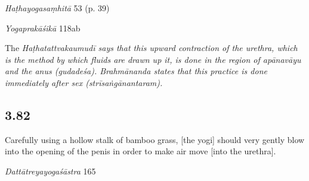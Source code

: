 \begin{ekdosis}
\begin{testimonia}[hp03_081]
\emph{Haṭhayogasaṃhitā} 53 (p. 39)
\begin{versinnote}
\end{versinnote}


\emph{Yogaprakāśikā} 118ab
\begin{versinnote}
\end{versinnote}
\end{testimonia}

\begin{philcomm}[hp03_081]
 The \sl{Haṭhatattvakaumudī} says that this upward contraction of the urethra, which is the method by which fluids are drawn up it, is done in the region of \emph{apānavāyu} and the anus (\emph{gudadeśa}). Brahmānanda states that this practice is done immediately after sex (\emph{strīsaṅgānantaram}).
\end{philcomm}

\subsection*{3.82}
\begin{translation}[hp03_082]
Carefully using a hollow stalk of bamboo grass, [the yogi] should very gently blow into the opening of the penis in order to make air move [into the urethra].
\end{translation}

\begin{sources}[hp03_082]
\emph{Dattātreyayogaśāstra} 165
\begin{versinnote}
\end{versinnote}
\end{sources}


\end{ekdosis}
